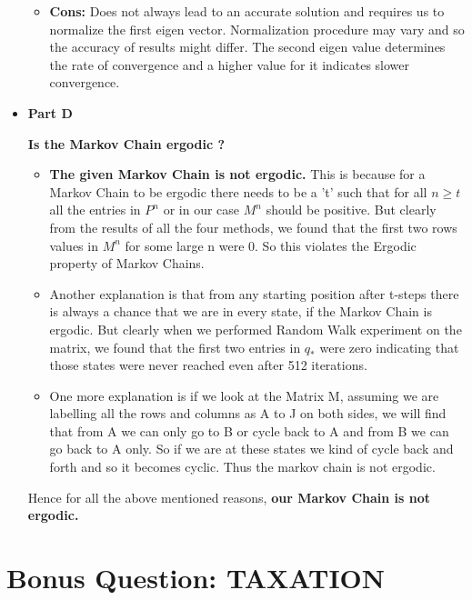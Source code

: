 \documentclass[11pt]{article}
\begin{document}
\begin{itemize}
\begin{itemize}
	\item[] \textbf{Cons:} Does not always lead to an accurate solution and requires us to normalize the first eigen vector. Normalization procedure may vary and so the accuracy of results might differ. The second eigen value determines the rate of convergence and a higher value for it indicates slower convergence.


\end{itemize}

\item[] \textbf{Part D}

\textbf{Is the Markov Chain ergodic ?}

\begin{itemize}

\item \textbf{The given Markov Chain is not ergodic.}  This is because for a Markov Chain to be ergodic there needs to be  a 't' such that for all $n \geq t $ all the entries in $P^n$ or in our case $M^n$ should be positive. But clearly from the results of all the four methods, we found that the first two rows values in $M^n$ for some large n were 0. So this violates the Ergodic property of Markov Chains.

\item Another explanation is that from any starting position after t-steps there is always a chance that we are  in every state, if the Markov Chain is ergodic. But clearly when we performed Random Walk experiment on the matrix, we found that the first two entries in $q_*$ were zero indicating that those states were never reached even after 512 iterations.

\item One more explanation is if we look at the Matrix M, assuming we are labelling all the rows and columns as A to J on both sides, we will find that from A we can only go to B or cycle back to A and from B we can go back to A only. So if we are at these states we kind of cycle back and forth and so it becomes cyclic. Thus the markov chain is not ergodic.





\end{itemize}

Hence for all the above mentioned reasons, \textbf{our Markov Chain is not ergodic.}

\end{itemize}

\newpage
\section{Bonus Question: TAXATION}
\end{document}
